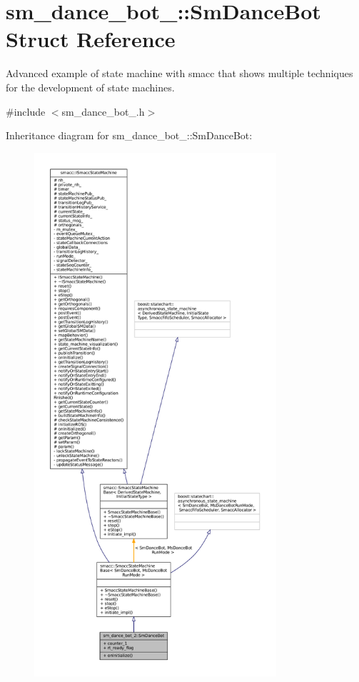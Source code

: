 \hypertarget{structsm__dance__bot__2_1_1SmDanceBot}{}\section{sm\+\_\+dance\+\_\+bot\+\_\+:\+:Sm\+Dance\+Bot Struct Reference}
\label{structsm__dance__bot__2_1_1SmDanceBot}


Advanced example of state machine with smacc that shows multiple techniques for the development of state machines.  




{\ttfamily \#include $<$sm\+\_\+dance\+\_\+bot\+\_.\+h$>$}



Inheritance diagram for sm\+\_\+dance\+\_\+bot\+\_\+:\+:Sm\+Dance\+Bot\+:
\nopagebreak
\begin{figure}[H]
\begin{center}
\leavevmode
\includegraphics[height=550pt]{structsm__dance__bot__2_1_1SmDanceBot__inherit__graph}
\end{center}
\end{figure}


